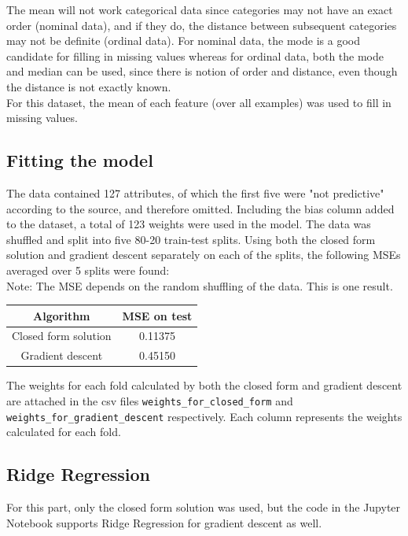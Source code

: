 \documentclass[paper=a4, fontsize=11pt]{scrartcl} %
\numberwithin{equation}{section} %
\numberwithin{figure}{section} %
\numberwithin{table}{section} %
\begin{document}
The mean will not work categorical data since categories may not have an exact order (nominal data), and if they do, the distance between subsequent categories may not be definite (ordinal data). For nominal data, the mode is a good candidate for filling in missing values whereas for ordinal data, both the mode and median can be used, since there is notion of order and distance, even though the distance is not exactly known. \\

For this dataset, the mean of each feature (over all examples) was used to fill in missing values.

\subsection{Fitting the model}
The data contained 127 attributes, of which the first five were "not predictive" according to the source, and therefore omitted. Including the bias column added to the dataset, a total of 123 weights were used in the model. The data was shuffled and split into five 80-20 train-test splits. Using both the closed form solution and gradient descent separately on each of the splits, the following MSEs averaged over 5 splits were found:\\

Note: The MSE depends on the random shuffling of the data. This is one result.
\begin{center}
\begin{tabular}{ |c|c| }
	\hline
	\textbf{Algorithm} & \textbf{MSE on test} \\
	\hline
    Closed form solution & 0.11375 \\
	Gradient descent & 0.45150 \\
	\hline
\end{tabular}
\end{center}

The weights for each fold calculated by both the closed form and gradient descent are attached in the csv files \texttt{weights\_for\_closed\_form} and \texttt{weights\_for\_gradient\_descent} respectively. Each column represents the weights calculated for each fold.

\subsection{Ridge Regression}
For this part, only the closed form solution was used, but the code in the Jupyter Notebook supports Ridge Regression for gradient descent as well. \\
\end{document}
